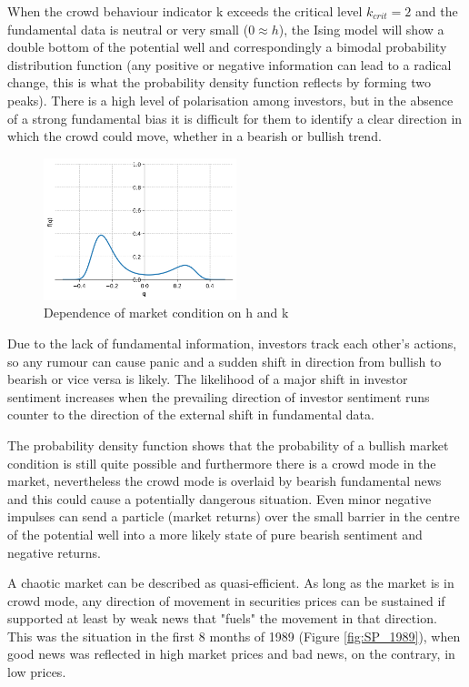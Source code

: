 When the crowd behaviour indicator k exceeds the critical level $k_{crit} = 2$ and the fundamental data is neutral or very small ($0 \approx h$), the Ising model will show a double bottom of the potential well and correspondingly a bimodal probability distribution function (any positive or negative information can lead to a radical change, this is what the probability density function reflects by forming two peaks). There is a high level of polarisation among investors, but in the absence of a strong fundamental bias it is difficult for them to identify a clear direction in which the crowd could move, whether in a bearish or bullish trend.  

\begin{figure}[h!]
  \includegraphics[width=0.5\textwidth]{figures/chaotic_market.png}
  \centering
  \caption{Dependence of market condition on h and k}
  \label{fig:chaotic_market}
\end{figure}

Due to the lack of fundamental information, investors track each other's actions, so any rumour can cause panic and a sudden shift in direction from bullish to bearish or vice versa is likely. The likelihood of a major shift in investor sentiment increases when the prevailing direction of investor sentiment runs counter to the direction of the external shift in fundamental data.

The probability density function shows that the probability of a bullish market condition is still quite possible and furthermore there is a crowd mode in the market, nevertheless the crowd mode is overlaid by bearish fundamental news and this could cause a potentially dangerous situation. Even minor negative impulses can send a particle (market returns) over the small barrier in the centre of the potential well into a more likely state of pure bearish sentiment and negative returns.

A chaotic market can be described as quasi-efficient. As long as the market is in crowd mode, any direction of movement in securities prices can be sustained if supported at least by weak news that "fuels" the movement in that direction. This was the situation in the first 8 months of 1989 (Figure \ref{fig:SP_1989}), when good news was reflected in high market prices and bad news, on the contrary, in low prices.

